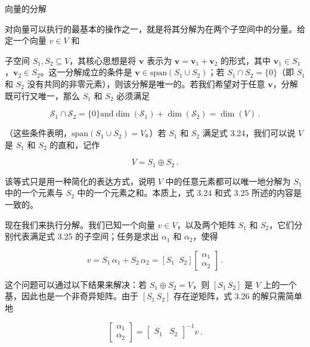 \documentclass[10pt,a4paper]{book}
\theoremstyle{thmstyle} %
\theoremstyle{defstyle} %
\theoremstyle{prostyle} %
\begin{document}
向量的分解



对向量可以执行的最基本的操作之一，就是将其分解为在两个子空间中的分量。给定一个向量 $v \in V$ 和



子空间 $S_1, S_2 \subseteq V$，其核心思想是将 $\boldsymbol{v}$ 表示为 $\boldsymbol{v} = \boldsymbol{v}_1 + \boldsymbol{v}_2$ 的形式，其中 $\boldsymbol{v}_1 \in S_1$，$\boldsymbol{v}_2 \in S_2$。这一分解成立的条件是 $\boldsymbol{v} \in \text{span}(S_1 \cup S_2)$；若 $S_1 \cap S_2 = \{0\}$（即 $S_1$ 和 $S_2$ 没有共同的非零元素），则该分解是唯一的。若我们希望对于任意 $\boldsymbol{v}$，分解既可行又唯一，那么 $S_1$ 和 $S_2$ 必须满足



$$
\mathcal { S } _ { 1 } \cap \mathcal { S } _ { 2 } = \{ 0 \}  \mathrm { a n d }  \dim ( \mathcal { S } _ { 1 } ) + \dim ( \mathcal { S } _ { 2 } ) = \dim ( V ) \, .
$$



（这些条件表明，$\text{span}(S_1 \cup S_2) = V$。）若 $S_1$ 和 $S_2$ 满足式 3.24，我们可以说 $V$ 是 $S_1$ 和 $S_2$ 的直和，记作



$$
V = S _ { 1 } \oplus S _ { 2 } \, .
$$



该等式只是用一种简化的表达方式，说明 $V$ 中的任意元素都可以唯一地分解为 $S_1$ 中的一个元素与 $S_2$ 中的一个元素之和。本质上，式 3.24 和式 3.25 所述的内容是一致的。



现在我们来执行分解。我们已知一个向量 $v \in V$，以及两个矩阵 $S_1$ 和 $S_2$，它们分别代表满足式 3.25 的子空间；任务是求出 $\alpha_1$ 和 $\alpha_2$，使得



$$
v = S _ { 1 } \, \alpha _ { 1 } + S _ { 2 } \, \alpha _ { 2 } = \left[ S _ { 1 } \, \, \, S _ { 2 } \right] \left[ \begin{array}{l} { \alpha _ { 1 } } \\{ \alpha _ { 2 } } \end{array} \right] \, .
$$



这个问题可以通过以下结果来解决：若 $S_1 \oplus S_2 = V$，则 $[S_1 \, S_2]$ 是 $V$ 上的一个基，因此也是一个非奇异矩阵。由于 $[S_1 \, S_2]$ 存在逆矩阵，式 3.26 的解只需简单地



$$
\left[ \begin{array}{l} { { \alpha _ { 1 } } } \\{ { \alpha _ { 2 } } } \end{array} \right] = \left[ \begin{array}{ll} { { S _ { 1 } } } & { { S _ { 2 } } } \end{array} \right] ^{- 1} v \, .
$$
\end{document}
